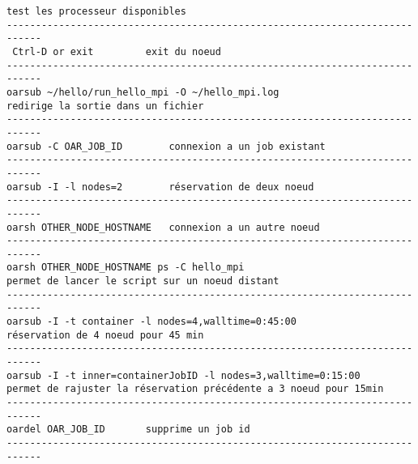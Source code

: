 \begin{lstlisting}
test les processeur disponibles
----------------------------------------------------------------------------
 Ctrl-D or exit			exit du noeud
----------------------------------------------------------------------------
oarsub ~/hello/run_hello_mpi -O ~/hello_mpi.log
redirige la sortie dans un fichier
----------------------------------------------------------------------------
oarsub -C OAR_JOB_ID		connexion a un job existant
----------------------------------------------------------------------------
oarsub -I -l nodes=2		réservation de deux noeud
----------------------------------------------------------------------------
oarsh OTHER_NODE_HOSTNAME	connexion a un autre noeud
----------------------------------------------------------------------------
oarsh OTHER_NODE_HOSTNAME ps -C hello_mpi
permet de lancer le script sur un noeud distant
----------------------------------------------------------------------------
oarsub -I -t container -l nodes=4,walltime=0:45:00
réservation de 4 noeud pour 45 min
----------------------------------------------------------------------------
oarsub -I -t inner=containerJobID -l nodes=3,walltime=0:15:00
permet de rajuster la réservation précédente a 3 noeud pour 15min
----------------------------------------------------------------------------
oardel OAR_JOB_ID		supprime un job id
----------------------------------------------------------------------------
\end{lstlisting}
